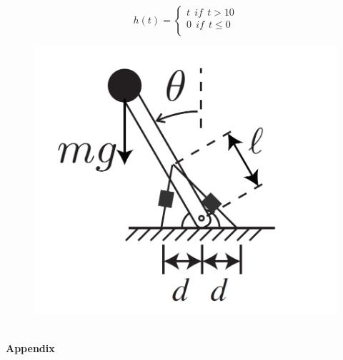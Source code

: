 \begin{enumerate}
	\begin{minipage}{0.45\textwidth}
		\begin{flushleft} \large
		\[   
		h(t) = 
     		\begin{cases}
     			t ~~ if ~~ t > 10 \\
     			0 ~~ if ~~ t \leq 0\\
     		\end{cases}
	\]
		\end{flushleft}
	\end{minipage}
	\begin{minipage}{0.5\textwidth}
		\begin{flushright} \large
		\begin{figure}[H]
			\center
			\setlength{\unitlength}{\textwidth} 
			\includegraphics[width=0.6\unitlength]{5}
		\end{figure}
		\end{flushright}
	\end{minipage}



	
	
	

\end{enumerate}

	 	
	

\begin{minipage}{1.0\textwidth}
\center
\- \\[0.5cm]
\textbf{\Large Appendix } 
\end{minipage} 

